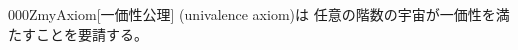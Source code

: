 \documentclass[index]{subfiles}
\begin{document}
\begin{myBlock}{000Z}{myAxiom}[一価性公理]
  (univalence axiom)は
  任意の階数の宇宙が一価性を満たすことを要請する。
\end{myBlock}
\end{document}
